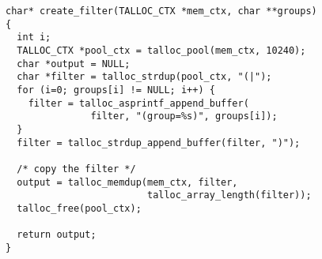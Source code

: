 \begin{lstlisting}[caption={Appending a string with a pool context},
morekeywords={talloc_pool,talloc_memdup}]
char* create_filter(TALLOC_CTX *mem_ctx, char **groups)
{
  int i;
  TALLOC_CTX *pool_ctx = talloc_pool(mem_ctx, 10240);
  char *output = NULL;
  char *filter = talloc_strdup(pool_ctx, "(|");
  for (i=0; groups[i] != NULL; i++) {
    filter = talloc_asprintf_append_buffer(
               filter, "(group=%s)", groups[i]);
  }
  filter = talloc_strdup_append_buffer(filter, ")");
  
  /* copy the filter */
  output = talloc_memdup(mem_ctx, filter,
                         talloc_array_length(filter));
  talloc_free(pool_ctx);

  return output;
}
\end{lstlisting}